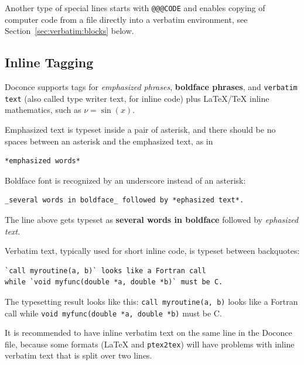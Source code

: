 \documentclass{article}
\begin{document}
Another type of special lines starts with {\fontsize{10pt}{10pt}\verb!@@@CODE!} and enables copying
of computer code from a file directly into a verbatim environment, see 
Section~\ref{sec:verbatim:blocks} below.

\subsection{Inline Tagging}

\label{inline:tagging}
   

Doconce supports tags for \emph{emphasized phrases}, \textbf{boldface phrases},
and {\fontsize{10pt}{10pt}\verb!verbatim text!} (also called type writer text, for inline code)
plus {\LaTeX}/TeX inline mathematics, such as $\nu = \sin(x)$.

Emphasized text is typeset inside a pair of asterisk, and there should
be no spaces between an asterisk and the emphasized text, as in
\begin{Verbatim}[fontsize=\fontsize{9pt}{9pt},tabsize=8,baselinestretch=0.85,
fontfamily=tt,xleftmargin=7mm]
*emphasized words*
\end{Verbatim}
\noindent

Boldface font is recognized by an underscore instead of an asterisk:
\begin{Verbatim}[fontsize=\fontsize{9pt}{9pt},tabsize=8,baselinestretch=0.85,
fontfamily=tt,xleftmargin=7mm]
_several words in boldface_ followed by *ephasized text*.
\end{Verbatim}
\noindent
The line above gets typeset as
\textbf{several words in boldface} followed by \emph{ephasized text}.

Verbatim text, typically used for short inline code,
is typeset between backquotes:
\begin{Verbatim}[fontsize=\fontsize{9pt}{9pt},tabsize=8,baselinestretch=0.85,
fontfamily=tt,xleftmargin=7mm]
`call myroutine(a, b)` looks like a Fortran call
while `void myfunc(double *a, double *b)` must be C.
\end{Verbatim}
\noindent
The typesetting result looks like this:
{\fontsize{10pt}{10pt}\verb!call myroutine(a, b)!} looks like a Fortran call
while {\fontsize{10pt}{10pt}\verb!void myfunc(double *a, double *b)!} must be C.

It is recommended to have inline verbatim text on the same line in
the Doconce file, because some formats ({\LaTeX} and {\fontsize{10pt}{10pt}\verb!ptex2tex!}) will have
problems with inline verbatim text that is split over two lines.
\end{document}
